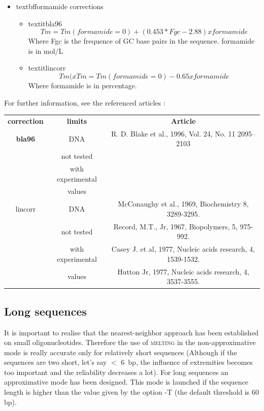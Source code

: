 \documentclass{article}
\begin{document}
\begin{itemize}
  \item textbf{formamide corrections}
  \begin{itemize}
  \item textit{bla96}
  \begin{displaymath}
  Tm=Tm(formamide=0)+ (0.453 * Fgc - 2.88) x formamide
  \end{displaymath}
  Where Fgc is the frequence of GC base pairs in the sequence.
  formamide is in mol/L
  \item textit{lincorr}
  \begin{displaymath}
  Tm (x %
  Tm=Tm(formamide=0)-0.65 x formamide
  \end{displaymath}
  Where formamide is in percentage.
  \end{itemize}
\end{itemize}

For further information, see the referenced articles :
\begin{table}[h]
\begin{tabular}[h]{| c | c | c |}
\textbf{correction} & \textbf{limits} & \textbf{Article} \\ 
\textbf{bla96} & DNA & R. D. Blake et al., 1996, Vol. 24, No. 11 2095–2103 \\
 & not tested & \\
 & with experimental & \\
 & values & \\
lincorr & DNA & McConaughy et al., 1969, Biochemistry 8, 3289-3295. \\
 & not tested & Record, M.T., Jr, 1967, Biopolymers, 5, 975-992. \\
 & with experimental & Casey J. et al, 1977, Nucleic acids research, 4, 1539-1532. \\
 & values & Hutton Jr, 1977, Nucleic acids research, 4, 3537-3555. \\
\end{tabular}
\end{table}

\subsection{Long sequences } 
 
It is important to realise that the nearest-neighbor approach has been established  
on small oligonucleotides. Therefore the use of \textsc{melting} in the non-approximative  
mode is really accurate only for relatively short sequences (Although if the sequences are 
two short, let's say $<$ 6~bp, the influence of extremities becomes too important and the  
reliability decreases a lot). For long sequences an approximative mode has been designed. 
This mode is launched if the sequence length is higher than the value given by the option -T 
(the default threshold is 60 bp).
 
\end{document}
